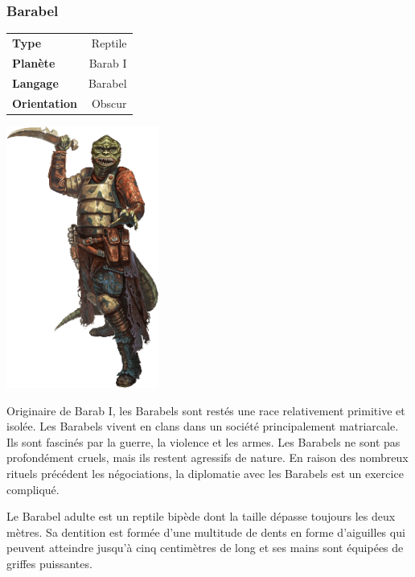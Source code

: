 \subsubsection{Barabel}
\begin{samepage}
    \begin{flushright}	
        \begin{tabular}{|l|r|}
            \textbf{Type}        & Reptile \\
            \textbf{Planète}     & Barab I \\
            \textbf{Langage}     & Barabel \\
            \textbf{Orientation} & Obscur \\
        \end{tabular}
    \end{flushright}

	\vspace{-5\baselineskip}
	\includegraphics[width=5cm]{img/personnages/races/barabel.png}
\end{samepage}

Originaire de Barab I, les Barabels sont restés une race relativement primitive et isolée. Les Barabels vivent en clans dans un société principalement matriarcale. Ils sont fascinés par la guerre, la violence et les armes. Les Barabels ne sont pas profondément cruels, mais ils restent agressifs de nature. En raison des nombreux rituels précédent les négociations, la diplomatie avec les Barabels est un exercice compliqué.

Le Barabel adulte est un reptile bipède dont la taille dépasse toujours les deux mètres. Sa dentition est formée d’une multitude de dents en forme d’aiguilles qui peuvent atteindre jusqu’à cinq centimètres de long et ses mains sont équipées de griffes puissantes.

